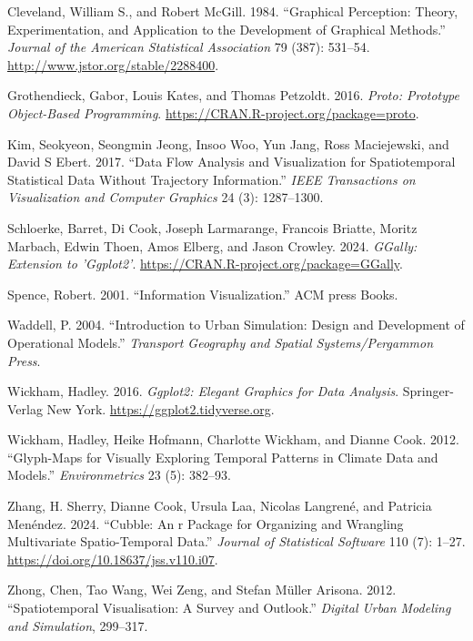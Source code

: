 \hypertarget{refs}{}
\begin{CSLReferences}{1}{0}
\leavevmode{}%
Cleveland, William S., and Robert McGill. 1984. {``Graphical Perception: Theory, Experimentation, and Application to the Development of Graphical Methods.''} \emph{Journal of the American Statistical Association} 79 (387): 531--54. \url{http://www.jstor.org/stable/2288400}.

\leavevmode{}%
Grothendieck, Gabor, Louis Kates, and Thomas Petzoldt. 2016. \emph{Proto: Prototype Object-Based Programming}. \url{https://CRAN.R-project.org/package=proto}.

\leavevmode{}%
Kim, Seokyeon, Seongmin Jeong, Insoo Woo, Yun Jang, Ross Maciejewski, and David S Ebert. 2017. {``Data Flow Analysis and Visualization for Spatiotemporal Statistical Data Without Trajectory Information.''} \emph{IEEE Transactions on Visualization and Computer Graphics} 24 (3): 1287--1300.

\leavevmode{}%
Schloerke, Barret, Di Cook, Joseph Larmarange, Francois Briatte, Moritz Marbach, Edwin Thoen, Amos Elberg, and Jason Crowley. 2024. \emph{GGally: Extension to 'Ggplot2'}. \url{https://CRAN.R-project.org/package=GGally}.

\leavevmode{}%
Spence, Robert. 2001. {``Information Visualization.''} ACM press Books.

\leavevmode{}%
Waddell, P. 2004. {``Introduction to Urban Simulation: Design and Development of Operational Models.''} \emph{Transport Geography and Spatial Systems/Pergammon Press}.

\leavevmode{}%
Wickham, Hadley. 2016. \emph{Ggplot2: Elegant Graphics for Data Analysis}. Springer-Verlag New York. \url{https://ggplot2.tidyverse.org}.

\leavevmode{}%
Wickham, Hadley, Heike Hofmann, Charlotte Wickham, and Dianne Cook. 2012. {``Glyph-Maps for Visually Exploring Temporal Patterns in Climate Data and Models.''} \emph{Environmetrics} 23 (5): 382--93.

\leavevmode{}%
Zhang, H. Sherry, Dianne Cook, Ursula Laa, Nicolas Langrené, and Patricia Menéndez. 2024. {``Cubble: An r Package for Organizing and Wrangling Multivariate Spatio-Temporal Data.''} \emph{Journal of Statistical Software} 110 (7): 1--27. \url{https://doi.org/10.18637/jss.v110.i07}.

\leavevmode{}%
Zhong, Chen, Tao Wang, Wei Zeng, and Stefan Müller Arisona. 2012. {``Spatiotemporal Visualisation: A Survey and Outlook.''} \emph{Digital Urban Modeling and Simulation}, 299--317.

\end{CSLReferences}


